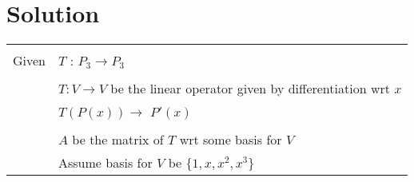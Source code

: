 \documentclass[journal,12pt]{IEEEtran}
\begin{document}
\section{\textbf{Solution}}
\begin{longtable}{|l|l|}
\hline
\multirow{3}{*}{Given       } &\\
& $T$ : $P_3 \xrightarrow{} P_3$ \\ 
& \\
& $T:V\xrightarrow{}V$ be the linear operator given by differentiation wrt $x$\\
& $T(P(x)) \xrightarrow{}$ $P'(x)$ \\
& \\
& $A$ be the matrix of $T$ wrt some basis for $V$ \\
& Assume basis for $V$ be $\{1,x,x^2,x^3\}$ \\
\hline
\end{longtable}
\newpage
\end{document}
